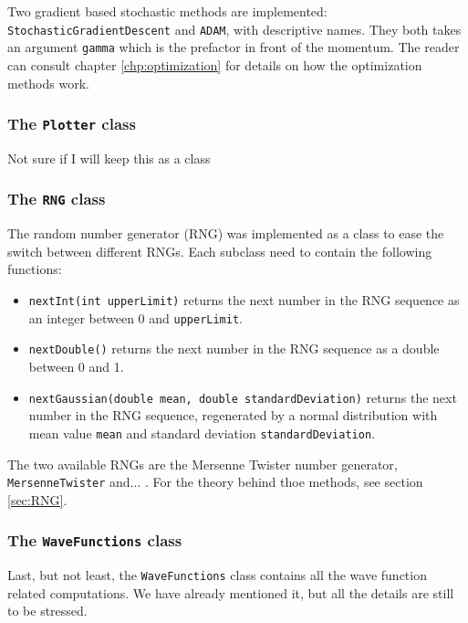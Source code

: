 Two gradient based stochastic methods are implemented: \texttt{StochasticGradientDescent} and \texttt{ADAM}, with descriptive names. They both takes an argument \texttt{gamma} which is the prefactor in front of the momentum. The reader can consult chapter \eqref{chp:optimization} for details on how the optimization methods work. 

\subsubsection{The \texttt{Plotter} class}
Not sure if I will keep this as a class

\subsubsection{The \texttt{RNG} class}
The random number generator (RNG) was implemented as a class to ease the switch between different RNGs. Each subclass need to contain the following functions:
\begin{itemize}
	\item \texttt{nextInt(int upperLimit)} returns the next number in the RNG sequence as an integer between 0 and \texttt{upperLimit}.
	
	\item \texttt{nextDouble()} returns the next number in the RNG sequence as a double between 0 and 1.
	
	\item \texttt{nextGaussian(double mean, double standardDeviation)} returns the next number in the RNG sequence, regenerated by a normal distribution with mean value \texttt{mean} and standard deviation \texttt{standardDeviation}.
\end{itemize}
The two available RNGs are the Mersenne Twister number generator, \texttt{MersenneTwister} and... . For the theory behind thoe methods, see section \eqref{sec:RNG}. 

\subsubsection{The \texttt{WaveFunctions} class}
Last, but not least, the \texttt{WaveFunctions} class contains all the wave function related computations. We have already mentioned it, but all the details are still to be stressed. 

